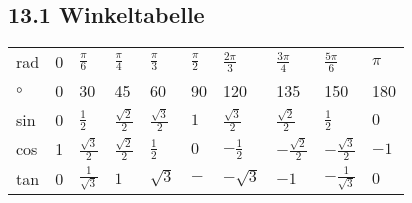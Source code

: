 \subsection{13.1 Winkeltabelle}{
\vskip1pt

\begin{tabularx}{0.99\columnwidth}{X|YYYYYYYYY}
	rad     & 0 &   $\frac{\pi}{6}$    &   $\frac{\pi}{4}$    &   $\frac{\pi}{3}$    &   $\frac{\pi}{2}$    &   $\frac{2\pi}{3}$   &   $\frac{3\pi}{4}$   &   $\frac{5\pi}{6}$    & $\pi$ \\
	$\circ$ & 0 &          30          &          45          &          60          &          90          &          120         &         135          &          150          &  180  \\ \hline
	sin     & 0 &     $\frac{1}{2}$    & $\frac{\sqrt{2}}{2}$ & $\frac{\sqrt{3}}{2}$ &         $1$          & $\frac{\sqrt{3}}{2}$ & $\frac{\sqrt{2}}{2}$ &     $\frac{1}{2}$     &  $0$  \\
	cos     & 1 & $\frac{\sqrt{3}}{2}$ & $\frac{\sqrt{2}}{2}$ &     $\frac{1}{2}$    &         $0$          &    $-\frac{1}{2}$    &$-\frac{\sqrt{2}}{2}$ &$-\frac{\sqrt{3}}{2}$  &  $-1$ \\
	tan     & 0 & $\frac{1}{\sqrt{3}}$ &         $1$          &      $\sqrt{3}$      &         $-$          &      $-\sqrt{3}$     &         $-1$         & $-\frac{1}{\sqrt{3}}$ &  $0$  \\
\end{tabularx}

}
\WhiteSpace